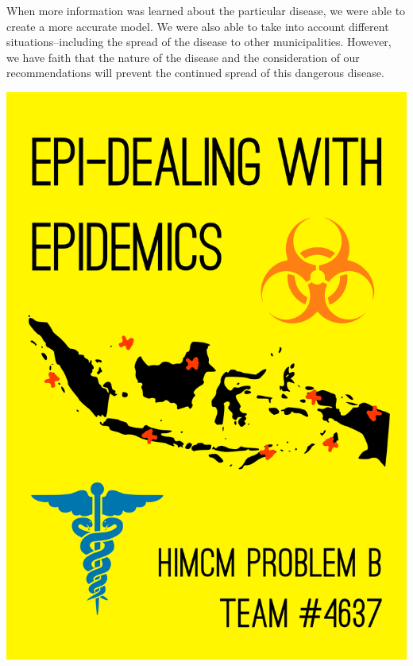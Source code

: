 \documentclass[11pt]{article}
\begin{document}
When more information was learned about the particular disease, we were able to create a more accurate model. We were also able to take into account different situations--including the spread of the disease to other municipalities. However, we have faith that the nature of the disease and the consideration of our recommendations will prevent the continued spread of this dangerous disease.

\newpage
\begin{center}
\includegraphics[width=\textwidth]{himcmcover}
\end{center}

\tableofcontents

\newpage
\end{document}

